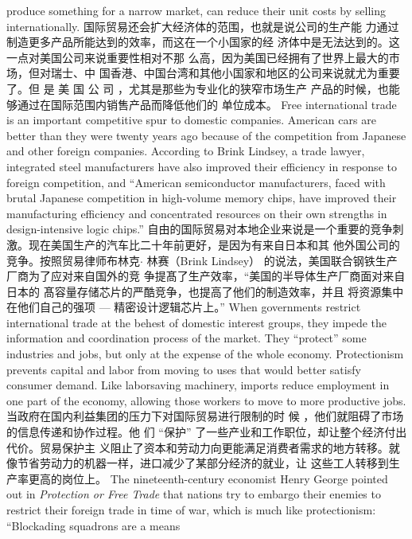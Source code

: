 \begin{paracol}{2}
produce something for a narrow market, can reduce their unit
costs by selling internationally.
\switchcolumn
国际贸易还会扩大经济体的范围，也就是说公司的生产能
力通过制造更多产品所能达到的效率，而这在一个小国家的经
济体中是无法达到的。这一点对美国公司来说重要性相对不那
么高，因为美国已经拥有了世界上最大的市场，但对瑞士、中
国香港、中国台湾和其他小国家和地区的公司来说就尤为重要
了。但 是 美 国 公 司 ，尤其是那些为专业化的狭窄市场生产
产品的时候，也能够通过在国际范围内销售产品而降低他们的
单位成本。
\switchcolumn*
Free international trade is an important competitive spur to
domestic companies. American cars are better than they were
twenty years ago because of the competition from Japanese and
other foreign companies. According to Brink Lindsey, a trade
lawyer, integrated steel manufacturers have also improved their
efficiency in response to foreign competition, and ``American
semiconductor manufacturers, faced with brutal Japanese competition in high-volume memory chips, have improved their
manufacturing efficiency and concentrated resources on their
own strengths in design-intensive logic chips.''
\switchcolumn
自由的国际贸易对本地企业来说是一个重要的竞争刺激。现在美国生产的汽车比二十年前更好，是因为有来自日本和其
他外国公司的竞争。按照贸易律师布林克$\cdot$ 林赛（Brink Lind­sey） 的说法，美国联合钢铁生产厂商为了应对来自国外的竞
争提髙了生产效率，“美国的半导体生产厂商面对来自日本的
髙容量存储芯片的严酷竞争，也提高了他们的制造效率，并且
将资源集中在他们自己的强项 --- 精密设计逻辑芯片上。”
\switchcolumn*
When governments restrict international trade at the behest
of domestic interest groups, they impede the information and
coordination process of the market. They ``protect'' some industries and jobs, but only at the expense of the whole economy.
Protectionism prevents capital and labor from moving to uses
that would better satisfy consumer demand. Like laborsaving
machinery, imports reduce employment in one part of the economy, allowing those workers to move to more productive jobs.
\switchcolumn
当政府在国内利益集团的压力下对国际贸易进行限制的时
候 ，他们就阻碍了市场的信息传递和协作过程。他 们 “保护”
了一些产业和工作职位，却让整个经济付出代价。贸易保护主
义阻止了资本和劳动力向更能满足消费者需求的地方转移。就
像节省劳动力的机器一样，进口减少了某部分经济的就业，让
这些工人转移到生产率更高的岗位上。
\switchcolumn*
The nineteenth-century economist Henry George pointed
out in \textit{Protection or Free Trade} that nations try to embargo their
enemies to restrict their foreign trade in time of war, which is
much like protectionism: ``Blockading squadrons are a means

\end{paracol}

